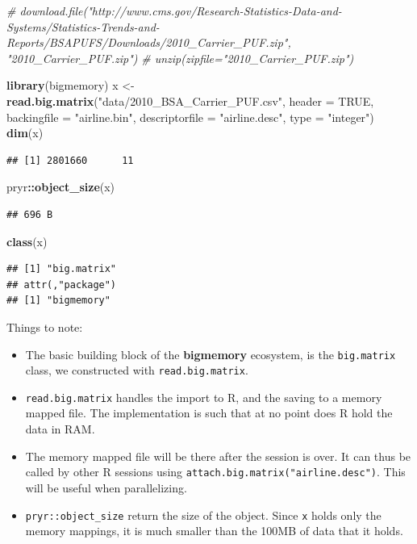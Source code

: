 \documentclass[]{book}
\newenvironment{Shaded}{\begin{snugshade}}{\end{snugshade}}
\newcommand{\KeywordTok}[1]{\textcolor[rgb]{0.13,0.29,0.53}{\textbf{#1}}}
\newcommand{\DataTypeTok}[1]{\textcolor[rgb]{0.13,0.29,0.53}{#1}}
\newcommand{\StringTok}[1]{\textcolor[rgb]{0.31,0.60,0.02}{#1}}
\newcommand{\CommentTok}[1]{\textcolor[rgb]{0.56,0.35,0.01}{\textit{#1}}}
\newcommand{\OtherTok}[1]{\textcolor[rgb]{0.56,0.35,0.01}{#1}}
\newcommand{\OperatorTok}[1]{\textcolor[rgb]{0.81,0.36,0.00}{\textbf{#1}}}
\newcommand{\NormalTok}[1]{#1}
\providecommand{\tightlist}{%
  \setlength{\itemsep}{0pt}\setlength{\parskip}{0pt}}
\theoremstyle{definition}
\theoremstyle{definition}
\theoremstyle{definition}
\theoremstyle{remark}
\begin{document}
\begin{Shaded}
\begin{Highlighting}[]
\CommentTok{# download.file("http://www.cms.gov/Research-Statistics-Data-and-Systems/Statistics-Trends-and-Reports/BSAPUFS/Downloads/2010_Carrier_PUF.zip", "2010_Carrier_PUF.zip")}
\CommentTok{# unzip(zipfile="2010_Carrier_PUF.zip")}

\KeywordTok{library}\NormalTok{(bigmemory)}
\NormalTok{x <-}\StringTok{ }\KeywordTok{read.big.matrix}\NormalTok{(}\StringTok{"data/2010_BSA_Carrier_PUF.csv"}\NormalTok{, }\DataTypeTok{header =} \OtherTok{TRUE}\NormalTok{, }
                     \DataTypeTok{backingfile =} \StringTok{"airline.bin"}\NormalTok{, }
                     \DataTypeTok{descriptorfile =} \StringTok{"airline.desc"}\NormalTok{, }
                     \DataTypeTok{type =} \StringTok{"integer"}\NormalTok{)}
\KeywordTok{dim}\NormalTok{(x)}
\end{Highlighting}
\end{Shaded}

\begin{verbatim}
## [1] 2801660      11
\end{verbatim}

\begin{Shaded}
\begin{Highlighting}[]
\NormalTok{pryr}\OperatorTok{::}\KeywordTok{object_size}\NormalTok{(x)}
\end{Highlighting}
\end{Shaded}

\begin{verbatim}
## 696 B
\end{verbatim}

\begin{Shaded}
\begin{Highlighting}[]
\KeywordTok{class}\NormalTok{(x)}
\end{Highlighting}
\end{Shaded}

\begin{verbatim}
## [1] "big.matrix"
## attr(,"package")
## [1] "bigmemory"
\end{verbatim}

Things to note:

\begin{itemize}
\tightlist
\item
  The basic building block of the \textbf{bigmemory} ecosystem, is the
  \texttt{big.matrix} class, we constructed with
  \texttt{read.big.matrix}.
\item
  \texttt{read.big.matrix} handles the import to R, and the saving to a
  memory mapped file. The implementation is such that at no point does R
  hold the data in RAM.
\item
  The memory mapped file will be there after the session is over. It can
  thus be called by other R sessions using
  \texttt{attach.big.matrix("airline.desc")}. This will be useful when
  parallelizing.
\item
  \texttt{pryr::object\_size} return the size of the object. Since
  \texttt{x} holds only the memory mappings, it is much smaller than the
  100MB of data that it holds.
\end{itemize}
\end{document}
